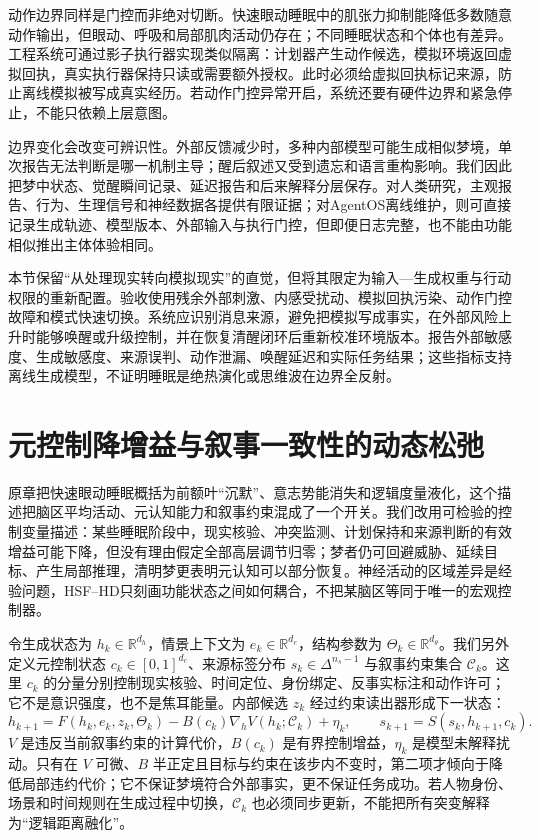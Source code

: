 动作边界同样是门控而非绝对切断。快速眼动睡眠中的肌张力抑制能降低多数随意动作输出，但眼动、呼吸和局部肌肉活动仍存在；不同睡眠状态和个体也有差异。工程系统可通过影子执行器实现类似隔离：计划器产生动作候选，模拟环境返回虚拟回执，真实执行器保持只读或需要额外授权。此时必须给虚拟回执标记来源，防止离线模拟被写成真实经历。若动作门控异常开启，系统还要有硬件边界和紧急停止，不能只依赖上层意图。

边界变化会改变可辨识性。外部反馈减少时，多种内部模型可能生成相似梦境，单次报告无法判断是哪一机制主导；醒后叙述又受到遗忘和语言重构影响。我们因此把梦中状态、觉醒瞬间记录、延迟报告和后来解释分层保存。对人类研究，主观报告、行为、生理信号和神经数据各提供有限证据；对AgentOS离线维护，则可直接记录生成轨迹、模型版本、外部输入与执行门控，但即便日志完整，也不能由功能相似推出主体体验相同。

本节保留“从处理现实转向模拟现实”的直觉，但将其限定为输入—生成权重与行动权限的重新配置。验收使用残余外部刺激、内感受扰动、模拟回执污染、动作门控故障和模式快速切换。系统应识别消息来源，避免把模拟写成事实，在外部风险上升时能够唤醒或升级控制，并在恢复清醒闭环后重新校准环境版本。报告外部敏感度、生成敏感度、来源误判、动作泄漏、唤醒延迟和实际任务结果；这些指标支持离线生成模型，不证明睡眠是绝热演化或思维波在边界全反射。

\section{元控制降增益与叙事一致性的动态松弛}
\label{sec:section_4656}
原章把快速眼动睡眠概括为前额叶“沉默”、意志势能消失和逻辑度量液化，这个描述把脑区平均活动、元认知能力和叙事约束混成了一个开关。我们改用可检验的控制变量描述：某些睡眠阶段中，现实核验、冲突监测、计划保持和来源判断的有效增益可能下降，但没有理由假定全部高层调节归零；梦者仍可回避威胁、延续目标、产生局部推理，清明梦更表明元认知可以部分恢复。神经活动的区域差异是经验问题，HSF--HD只刻画功能状态之间如何耦合，不把某脑区等同于唯一的宏观控制器。

令生成状态为 $h_k\in\mathbb R^{d_h}$，情景上下文为 $e_k\in\mathbb R^{d_e}$，结构参数为 $\Theta_k\in\mathbb R^{d_\theta}$。我们另外定义元控制状态 $c_k\in[0,1]^{d_c}$、来源标签分布 $s_k\in\Delta^{n_s-1}$ 与叙事约束集合 $\mathcal C_k$。这里 $c_k$ 的分量分别控制现实核验、时间定位、身份绑定、反事实标注和动作许可；它不是意识强度，也不是焦耳能量。内部候选 $z_k$ 经过约束读出器形成下一状态：
\[
h_{k+1}=F(h_k,e_k,z_k,\Theta_k)-B(c_k)\nabla_h V(h_k;\mathcal C_k)+\eta_k,
\qquad s_{k+1}=S(s_k,h_{k+1},c_k).
\]
$V$ 是违反当前叙事约束的计算代价，$B(c_k)$ 是有界控制增益，$\eta_k$ 是模型未解释扰动。只有在 $V$ 可微、$B$ 半正定且目标与约束在该步内不变时，第二项才倾向于降低局部违约代价；它不保证梦境符合外部事实，更不保证任务成功。若人物身份、场景和时间规则在生成过程中切换，$\mathcal C_k$ 也必须同步更新，不能把所有突变解释为“逻辑距离融化”。

